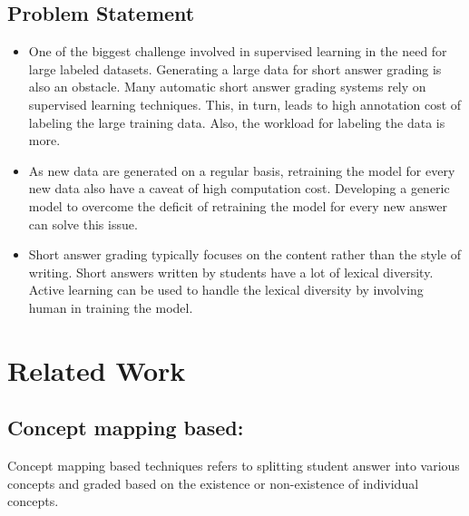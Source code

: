 \documentclass[rnd]{mas_proposal}
\begin{document}
\section{Problem Statement}
\begin{itemize}   {\tiny }
\vspace*{1\baselineskip}
    \item One of the biggest challenge involved in supervised learning in the need for large labeled datasets. Generating a large data for short answer grading is also an obstacle. Many automatic short answer grading systems rely on supervised learning techniques. This, in turn, leads to high annotation cost of labeling the large training data. Also, the workload for labeling the data is more.
    \item As new data are generated on a regular basis, retraining the model for every new data also have a caveat of high computation cost.  Developing a generic model to overcome the deficit of retraining the model for every new answer can solve this issue.
    \item Short answer grading typically focuses on the content rather than the style of writing. Short answers written by students have a lot of lexical diversity. Active learning can be used to handle the lexical diversity by involving human in training the model.
\end{itemize}


\chapter{Related Work}

\section{Concept mapping based:}
	Concept mapping based techniques refers to splitting student answer into various concepts and graded based on the existence or non-existence of individual concepts\cite{Burrows2015}.
	
\end{document}
